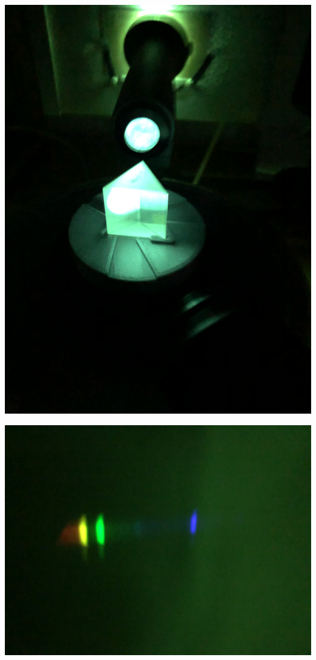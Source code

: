 \documentclass[11pt,ngerman]{scrartcl}
\begin{document}
\begin{minipage}{\textwidth}
	\begin{minipage}[t]{0.35\textwidth}
		\centering
		\includegraphics[angle=-90,width=\textwidth]{prisma_st}
		\label{fig:prisma_st}
	\end{minipage}
	\vspace{2mm}
	\begin{minipage}[t]{0.63\textwidth}
		\centering
		\includegraphics[width=\textwidth]{farben}
		\label{fig:farben}
	\end{minipage}
	\vspace{1em}
\end{minipage}
\end{document}
